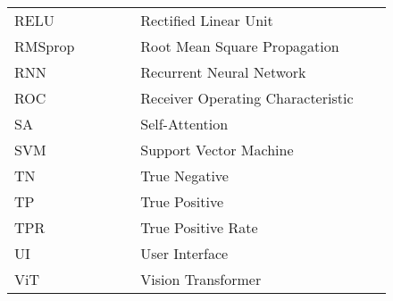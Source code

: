 \begin{flushleft}
\begin{longtable}{@{}p{0.3\linewidth}p{0.6\linewidth}@{}}
        RELU      & Rectified Linear Unit                    \\
        RMSprop   & Root Mean Square Propagation             \\
        RNN       & Recurrent Neural Network                 \\
        ROC       & Receiver Operating Characteristic        \\
        SA        & Self-Attention                           \\
        SVM       & Support Vector Machine                   \\
        TN        & True Negative                            \\
        TP        & True Positive                            \\
        TPR       & True Positive Rate                       \\
        UI        & User Interface                           \\
        ViT       & Vision Transformer                       \\
    \end{longtable}
\end{flushleft}

